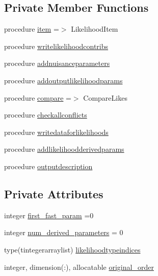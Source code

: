 \subsection*{Private Member Functions}
\begin{DoxyCompactItemize}
\item 
procedure \mbox{\hyperlink{structgeneraltypes_1_1tlikelihoodlist_a3f4e732500e1ce661871a3f1f079b4e6}{item}} =$>$ Likelihood\+Item
\item 
procedure \mbox{\hyperlink{structgeneraltypes_1_1tlikelihoodlist_a1a03e5948120437aabb0db116876a5f3}{writelikelihoodcontribs}}
\item 
procedure \mbox{\hyperlink{structgeneraltypes_1_1tlikelihoodlist_ad35d39c517c5c22100d704b12358a293}{addnuisanceparameters}}
\item 
procedure \mbox{\hyperlink{structgeneraltypes_1_1tlikelihoodlist_a40da955d529a806e4e2cff1f557c6936}{addoutputlikelihoodparams}}
\item 
procedure \mbox{\hyperlink{structgeneraltypes_1_1tlikelihoodlist_aee967d6574b488c2188f26c25e797e22}{compare}} =$>$ Compare\+Likes
\item 
procedure \mbox{\hyperlink{structgeneraltypes_1_1tlikelihoodlist_a7fd7213e51adbef5ee081179d4e66f0a}{checkallconflicts}}
\item 
procedure \mbox{\hyperlink{structgeneraltypes_1_1tlikelihoodlist_ae5067c498ee0f91ba837437d3032a9d4}{writedataforlikelihoods}}
\item 
procedure \mbox{\hyperlink{structgeneraltypes_1_1tlikelihoodlist_abfb079fb97e061a5ed7c560fbcbe2c0b}{addlikelihoodderivedparams}}
\item 
procedure \mbox{\hyperlink{structgeneraltypes_1_1tlikelihoodlist_a640662f1f17a6040ed09da3c8791fdcc}{outputdescription}}
\end{DoxyCompactItemize}
\subsection*{Private Attributes}
\begin{DoxyCompactItemize}
\item 
integer \mbox{\hyperlink{structgeneraltypes_1_1tlikelihoodlist_a275278d821c77d65cb9542d73ffacc5f}{first\+\_\+fast\+\_\+param}} =0
\item 
integer \mbox{\hyperlink{structgeneraltypes_1_1tlikelihoodlist_af4307d94b284bbbe28012531e2ba299e}{num\+\_\+derived\+\_\+parameters}} = 0
\item 
type(tintegerarraylist) \mbox{\hyperlink{structgeneraltypes_1_1tlikelihoodlist_a4e520af97feadba2177db514ecf4f52b}{likelihoodtypeindices}}
\item 
integer, dimension(\+:), allocatable \mbox{\hyperlink{structgeneraltypes_1_1tlikelihoodlist_a9c5e94bf8eee21c3870c49b3ee51d9d9}{original\+\_\+order}}
\end{DoxyCompactItemize}


